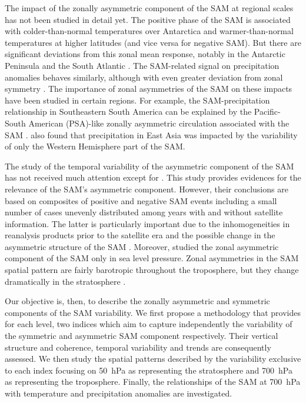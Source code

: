 \documentclass[smallextended]{svjour3}       %
\begin{document}
The impact of the zonally asymmetric component of the SAM at regional scales has not been studied in detail yet. The positive phase of the SAM is associated with colder-than-normal temperatures over Antarctica and warmer-than-normal temperatures at higher latitudes \citep{jones2019} (and vice versa for negative SAM). But there are significant deviations from this zonal mean response, notably in the Antarctic Peninsula and the South Atlantic \citep{fogt2012}. The SAM-related signal on precipitation anomalies behaves similarly, although with even greater deviation from zonal symmetry \citep{lim2016}. The importance of zonal asymmetries of the SAM on these impacts have been studied in certain regions. For example, the SAM-precipitation relationship in Southeastern South America can be explained by the Pacific-South American (PSA)-like zonally asymmetric circulation associated with the SAM \citep{silvestri2009, rosso2018}. \citet{fan2007} also found that precipitation in East Asia was impacted by the variability of only the Western Hemisphere part of the SAM.

The study of the temporal variability of the asymmetric component of the SAM has not received much attention except for \citet{fogt2012}. This study provides evidences for the relevance of the SAM's asymmetric component. However, their conclusions are based on composites of positive and negative SAM events including a small number of cases unevenly distributed among years with and without satellite information. The latter is particularly important due to the inhomogeneities in reanalysis products prior to the satellite era and the possible change in the asymmetric structure of the SAM \citep{silvestri2009}. Moreover, \citet{fogt2012} studied the zonal asymmetric component of the SAM only in sea level pressure. Zonal asymmetries in the SAM spatial pattern are fairly barotropic throughout the troposphere, but they change dramatically in the stratosphere \citep{baldwin2009}.

Our objective is, then, to describe the zonally asymmetric and symmetric components of the SAM variability. We first propose a methodology that provides for each level, two indices which aim to capture independently the variability of the symmetric and asymmetric SAM component respectively. Their vertical structure and coherence, temporal variability and trends are consequently assessed. We then study the spatial patterns described by the variability exclusive to each index focusing on 50~hPa as representing the stratosphere and 700~hPa as representing the troposphere. Finally, the relationships of the SAM at 700~hPa with temperature and precipitation anomalies are investigated.
\end{document}
